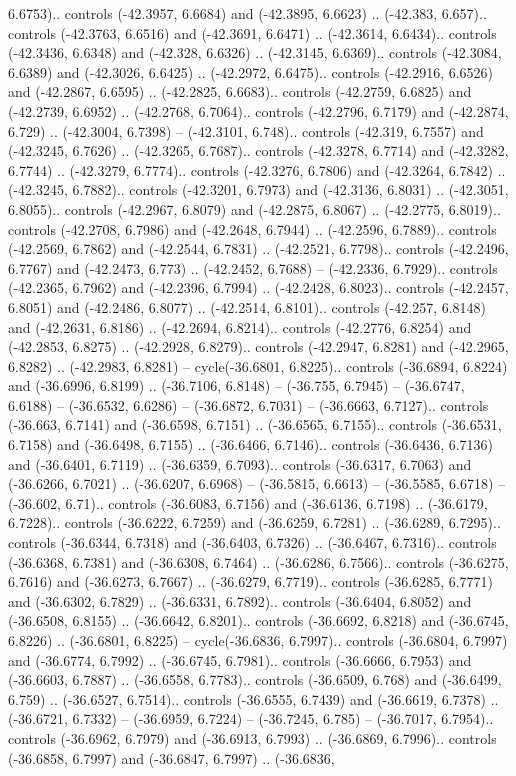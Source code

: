 \begin{scope}[shift={(2.5552, 9.9912)}]
\begin{scope}[shift={(48.1654, -14.8546)}]
6.6753).. controls (-42.3957, 6.6684) and (-42.3895, 6.6623) .. (-42.383, 6.657).. controls (-42.3763, 6.6516) and (-42.3691, 6.6471) .. (-42.3614, 6.6434).. controls (-42.3436, 6.6348) and (-42.328, 6.6326) .. (-42.3145, 6.6369).. controls (-42.3084, 6.6389) and (-42.3026, 6.6425) .. (-42.2972, 6.6475).. controls (-42.2916, 6.6526) and (-42.2867, 6.6595) .. (-42.2825, 6.6683).. controls (-42.2759, 6.6825) and (-42.2739, 6.6952) .. (-42.2768, 6.7064).. controls (-42.2796, 6.7179) and (-42.2874, 6.729) .. (-42.3004, 6.7398) -- (-42.3101, 6.748).. controls (-42.319, 6.7557) and (-42.3245, 6.7626) .. (-42.3265, 6.7687).. controls (-42.3278, 6.7714) and (-42.3282, 6.7744) .. (-42.3279, 6.7774).. controls (-42.3276, 6.7806) and (-42.3264, 6.7842) .. (-42.3245, 6.7882).. controls (-42.3201, 6.7973) and (-42.3136, 6.8031) .. (-42.3051, 6.8055).. controls (-42.2967, 6.8079) and (-42.2875, 6.8067) .. (-42.2775, 6.8019).. controls (-42.2708, 6.7986) and (-42.2648, 6.7944) .. (-42.2596, 6.7889).. controls (-42.2569, 6.7862) and (-42.2544, 6.7831) .. (-42.2521, 6.7798).. controls (-42.2496, 6.7767) and (-42.2473, 6.773) .. (-42.2452, 6.7688) -- (-42.2336, 6.7929).. controls (-42.2365, 6.7962) and (-42.2396, 6.7994) .. (-42.2428, 6.8023).. controls (-42.2457, 6.8051) and (-42.2486, 6.8077) .. (-42.2514, 6.8101).. controls (-42.257, 6.8148) and (-42.2631, 6.8186) .. (-42.2694, 6.8214).. controls (-42.2776, 6.8254) and (-42.2853, 6.8275) .. (-42.2928, 6.8279).. controls (-42.2947, 6.8281) and (-42.2965, 6.8282) .. (-42.2983, 6.8281) -- cycle(-36.6801, 6.8225).. controls (-36.6894, 6.8224) and (-36.6996, 6.8199) .. (-36.7106, 6.8148) -- (-36.755, 6.7945) -- (-36.6747, 6.6188) -- (-36.6532, 6.6286) -- (-36.6872, 6.7031) -- (-36.6663, 6.7127).. controls (-36.663, 6.7141) and (-36.6598, 6.7151) .. (-36.6565, 6.7155).. controls (-36.6531, 6.7158) and (-36.6498, 6.7155) .. (-36.6466, 6.7146).. controls (-36.6436, 6.7136) and (-36.6401, 6.7119) .. (-36.6359, 6.7093).. controls (-36.6317, 6.7063) and (-36.6266, 6.7021) .. (-36.6207, 6.6968) -- (-36.5815, 6.6613) -- (-36.5585, 6.6718) -- (-36.602, 6.71).. controls (-36.6083, 6.7156) and (-36.6136, 6.7198) .. (-36.6179, 6.7228).. controls (-36.6222, 6.7259) and (-36.6259, 6.7281) .. (-36.6289, 6.7295).. controls (-36.6344, 6.7318) and (-36.6403, 6.7326) .. (-36.6467, 6.7316).. controls (-36.6368, 6.7381) and (-36.6308, 6.7464) .. (-36.6286, 6.7566).. controls (-36.6275, 6.7616) and (-36.6273, 6.7667) .. (-36.6279, 6.7719).. controls (-36.6285, 6.7771) and (-36.6302, 6.7829) .. (-36.6331, 6.7892).. controls (-36.6404, 6.8052) and (-36.6508, 6.8155) .. (-36.6642, 6.8201).. controls (-36.6692, 6.8218) and (-36.6745, 6.8226) .. (-36.6801, 6.8225) -- cycle(-36.6836, 6.7997).. controls (-36.6804, 6.7997) and (-36.6774, 6.7992) .. (-36.6745, 6.7981).. controls (-36.6666, 6.7953) and (-36.6603, 6.7887) .. (-36.6558, 6.7783).. controls (-36.6509, 6.768) and (-36.6499, 6.759) .. (-36.6527, 6.7514).. controls (-36.6555, 6.7439) and (-36.6619, 6.7378) .. (-36.6721, 6.7332) -- (-36.6959, 6.7224) -- (-36.7245, 6.785) -- (-36.7017, 6.7954).. controls (-36.6962, 6.7979) and (-36.6913, 6.7993) .. (-36.6869, 6.7996).. controls (-36.6858, 6.7997) and (-36.6847, 6.7997) .. (-36.6836, 
\end{scope}
\end{scope}

